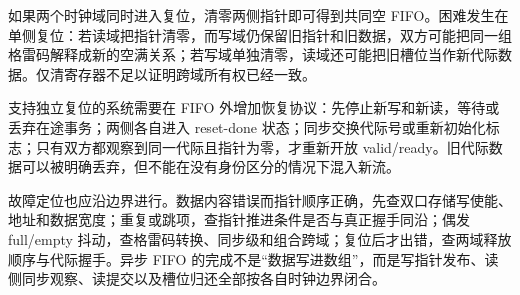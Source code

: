 
如果两个时钟域同时进入复位，清零两侧指针即可得到共同空 FIFO。困难发生在单侧复位：若读域把指针清零，而写域仍保留旧指针和旧数据，双方可能把同一组格雷码解释成新的空满关系；若写域单独清零，读域还可能把旧槽位当作新代际数据。仅清寄存器不足以证明跨域所有权已经一致。

支持独立复位的系统需要在 FIFO 外增加恢复协议：先停止新写和新读，等待或丢弃在途事务；两侧各自进入 reset-done 状态；同步交换代际号或重新初始化标志；只有双方都观察到同一代际且指针为零，才重新开放 valid/ready。旧代际数据可以被明确丢弃，但不能在没有身份区分的情况下混入新流。

故障定位也应沿边界进行。数据内容错误而指针顺序正确，先查双口存储写使能、地址和数据宽度；重复或跳项，查指针推进条件是否与真正握手同沿；偶发 full/empty 抖动，查格雷码转换、同步级和组合跨域；复位后才出错，查两域释放顺序与代际握手。异步 FIFO 的完成不是“数据写进数组”，而是写指针发布、读侧同步观察、读提交以及槽位归还全部按各自时钟边界闭合。
